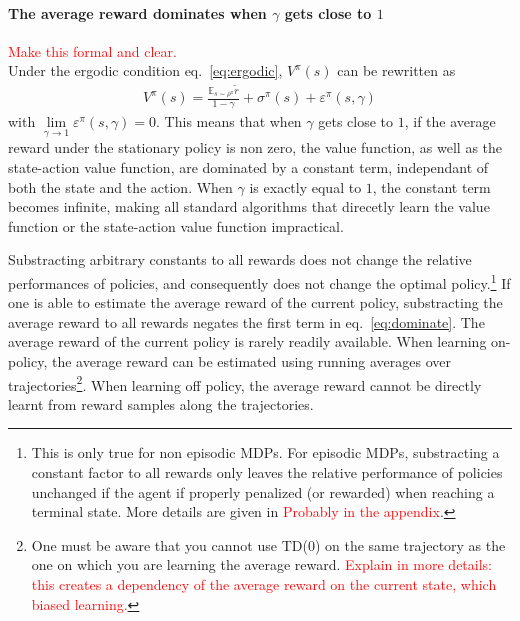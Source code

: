 \documentclass[11pt]{article}
\newcommand{\E}{\mathbb{E}}
\newcommand{\TODO}[1]{\textcolor{red}{#1}}
\begin{document}
\paragraph{The average reward dominates when $\gamma$ gets close to $1$}
\TODO{Make this formal and clear.}\\
Under the ergodic condition eq.~\eqref{eq:ergodic}, $V^\pi(s)$ can be rewritten as
\begin{align}
	V^\pi(s) = \frac{\E_{s\sim\rho^\pi}\tilde{r}}{1 - \gamma} +
	\sigma^\pi(s) + \varepsilon^\pi(s, \gamma)
	\label{eq:dominate}
\end{align}
with $\lim\limits_{\gamma\to 1}\varepsilon^\pi(s, \gamma) = 0$. This means that
when $\gamma$ gets close to $1$, if the average reward under the stationary
policy is non zero, the value function, as well as the state-action value
function, are dominated by a constant term, independant of both the state and
the action. When $\gamma$ is exactly equal to $1$, the constant term becomes
infinite, making all standard algorithms that direcetly learn the value
function or the state-action value function impractical. 

Substracting arbitrary constants to all rewards does not change the relative
performances of policies, and consequently does not change the optimal
policy.\footnote{
	This is only true for non episodic MDPs. For episodic MDPs, substracting
	a constant factor to all rewards only leaves the relative performance of
	policies unchanged if the agent if properly penalized (or rewarded) when
	reaching a terminal state. More details are given in
	\TODO{Probably in the appendix}.
} If one is able to estimate the average reward of the current policy, substracting
the average reward to all rewards negates the first term in eq.~\eqref{eq:dominate}.
The average reward of the current policy is rarely readily available. When learning
on-policy, the average reward can be estimated using running averages
over trajectories\footnote{One must be aware that you cannot use TD(0) on the 
	same trajectory as the one on which you are learning the average reward.
	\TODO{Explain in more details: this creates a dependency of the average
	reward on the current state, which biased learning.}
}. When learning off policy, the average reward cannot be directly learnt from reward
samples along the trajectories.
\end{document}
